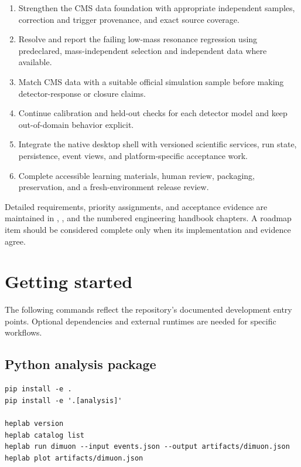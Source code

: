 \documentclass[11pt,a4paper]{article}
\begin{document}
\begin{enumerate}
  \item Strengthen the CMS data foundation with appropriate independent
  samples, correction and trigger provenance, and exact source coverage.
  \item Resolve and report the failing low-mass resonance regression using
  predeclared, mass-independent selection and independent data where available.
  \item Match CMS data with a suitable official simulation sample before making
  detector-response or closure claims.
  \item Continue calibration and held-out checks for each detector model and
  keep out-of-domain behavior explicit.
  \item Integrate the native desktop shell with versioned scientific services,
  run state, persistence, event views, and platform-specific acceptance work.
  \item Complete accessible learning materials, human review, packaging,
  preservation, and a fresh-environment release review.
\end{enumerate}

Detailed requirements, priority assignments, and acceptance evidence are
maintained in ,
, and the numbered
engineering handbook chapters. A roadmap item should be considered complete
only when its implementation and evidence agree.

\section{Getting started}

The following commands reflect the repository's documented development entry
points. Optional dependencies and external runtimes are needed for specific
workflows.

\subsection{Python analysis package}

\begin{lstlisting}
pip install -e .
pip install -e '.[analysis]'

heplab version
heplab catalog list
heplab run dimuon --input events.json --output artifacts/dimuon.json
heplab plot artifacts/dimuon.json
\end{lstlisting}
\end{document}
